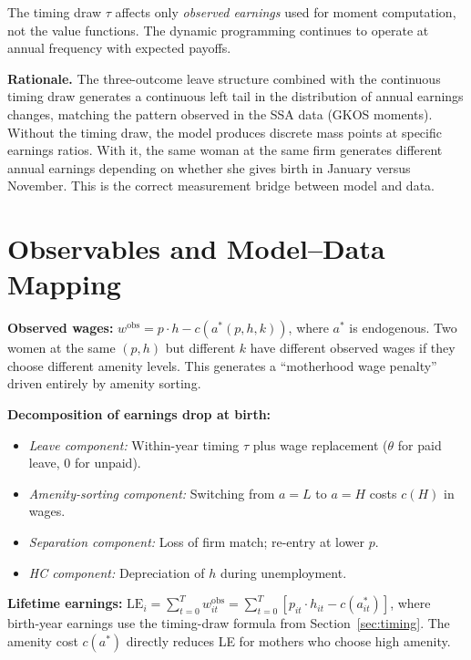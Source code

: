 \documentclass[11pt]{article}
\newcommand{\LE}{\mathrm{LE}}
\begin{document}
\noindent The timing draw $\tau$ affects only \emph{observed earnings} used for moment computation, not the value functions. The dynamic programming continues to operate at annual frequency with expected payoffs.

\medskip\noindent\textbf{Rationale.} The three-outcome leave structure combined with the continuous timing draw generates a continuous left tail in the distribution of annual earnings changes, matching the pattern observed in the SSA data (GKOS moments). Without the timing draw, the model produces discrete mass points at specific earnings ratios. With it, the same woman at the same firm generates different annual earnings depending on whether she gives birth in January versus November. This is the correct measurement bridge between model and data.

\section{Observables and Model--Data Mapping}\label{sec:observables}

\textbf{Observed wages:} $w^{\text{obs}} = p \cdot h - c(a^*(p, h, k))$, where $a^*$ is endogenous. Two women at the same $(p, h)$ but different $k$ have different observed wages if they choose different amenity levels. This generates a ``motherhood wage penalty'' driven entirely by amenity sorting.

\medskip\noindent\textbf{Decomposition of earnings drop at birth:}
\begin{itemize}[nosep]
  \item \emph{Leave component:} Within-year timing $\tau$ plus wage replacement ($\theta$ for paid leave, 0 for unpaid).
  \item \emph{Amenity-sorting component:} Switching from $a = L$ to $a = H$ costs $c(H)$ in wages.
  \item \emph{Separation component:} Loss of firm match; re-entry at lower $p$.
  \item \emph{HC component:} Depreciation of $h$ during unemployment.
\end{itemize}

\medskip\noindent\textbf{Lifetime earnings:} $\LE_i = \sum_{t=0}^{T} w^{\text{obs}}_{it} = \sum_{t=0}^{T} [p_{it} \cdot h_{it} - c(a^*_{it})]$, where birth-year earnings use the timing-draw formula from Section~\ref{sec:timing}. The amenity cost $c(a^*)$ directly reduces LE for mothers who choose high amenity.
\end{document}
